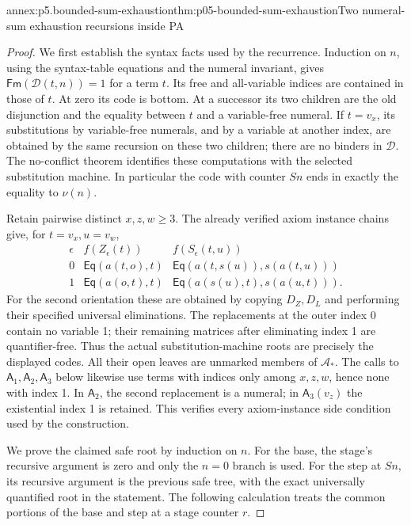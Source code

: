 \begin{annexitem}{annex:p5.bounded-sum-exhaustion}{thm:p05-bounded-sum-exhaustion}{Two numeral-sum exhaustion recursions inside PA}
\begin{proof}
We first establish the syntax facts used by the recurrence. Induction on
\(n\), using the syntax-table equations and the numeral invariant, gives
\(\mathsf{Fm}(\mathcal D(t,n))=1\) for a term \(t\). Its free and
all-variable indices are contained in those of \(t\). At zero its code
is bottom. At a successor its two children are the old disjunction and
the equality between \(t\) and a variable-free numeral. If \(t=v_x\),
its substitutions by variable-free numerals, and by a variable at another
index, are obtained by the same recursion on these two children; there
are no binders in \(\mathcal D\). The no-conflict theorem identifies
these computations with the selected substitution machine. In particular
the code with counter \(Sn\) ends in exactly the equality to \(\nu(n)\).

Retain pairwise distinct \(x,z,w\geq3\). The already verified axiom
instance chains give, for \(t=v_x,u=v_w\),
\[
\begin{array}{c|c|c}
 \epsilon&f(Z_\epsilon(t))&f(S_\epsilon(t,u))\\\hline
 0&\mathsf{Eq}(a(t,o),t)&\mathsf{Eq}(a(t,s(u)),s(a(t,u)))\\
 1&\mathsf{Eq}(a(o,t),t)&\mathsf{Eq}(a(s(u),t),s(a(u,t))).
\end{array}
\]
For the second orientation these are obtained by copying \(D_Z,D_L\)
and performing their specified universal eliminations. The replacements
at the outer index 0 contain no variable 1; their remaining matrices
after eliminating index 1 are quantifier-free. Thus the actual
substitution-machine roots are precisely the displayed codes. All their
open leaves are unmarked members of \(\mathcal A_*\). The calls to
\(\mathsf A_1,\mathsf A_2,\mathsf A_3\) below likewise use terms
with indices only among \(x,z,w\), hence none with index 1. In
\(\mathsf A_2\), the second replacement is a numeral; in
\(\mathsf A_3(v_z)\) the existential index 1 is retained. This verifies
every axiom-instance side condition used by the construction.

We prove the claimed safe root by induction on \(n\). For the base,
the stage's recursive argument is zero and only the \(n=0\) branch
is used. For the step at \(Sn\), its recursive argument is the
previous safe tree, with the exact universally quantified root in the
statement. The following calculation treats the common portions of the
base and step at a stage counter \(r\).


\end{proof}
\end{annexitem}

